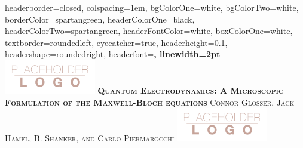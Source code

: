 \documentclass[landscape,a0paper,fontscale=0.285]{baposter} %
\begin{document}
\begin{poster}
{
headerborder=closed, %
colspacing=1em, %
bgColorOne=white, %
bgColorTwo=white, %
borderColor=spartangreen, %
headerColorOne=black, %
headerColorTwo=spartangreen, %
headerFontColor=white, %
boxColorOne=white, %
textborder=roundedleft, %
eyecatcher=true, %
headerheight=0.1\textheight, %
headershape=roundedright, %
headerfont=\Large\bf\textsc, %
linewidth=2pt %
}
%
{\includegraphics[height=4em]{logo.png}} %
{\bf\textsc{Quantum Electrodynamics: A Microscopic Formulation of the Maxwell-Bloch equations}\vspace{0.2em}} %
{\textsc{Connor Glosser, Jack Hamel, B. Shanker, and Carlo Piermarocchi}} %
{\includegraphics[height=4em]{logo.png}} %



\end{poster}
\end{document}
